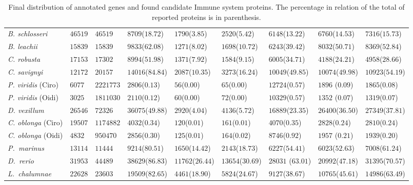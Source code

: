 \documentclass[11pt]{article}
\begin{document}
\begin{table}
\begin{tabular}{p{3.2cm}p{2cm}p{2cm}p{2cm}p{2cm}p{2cm}p{2cm}p{2.7cm}p{2.6cm}}
\textsl{B. schlosseri}& $46519$&$46519$&$8709$($18.72$)&$1790$($3.85$)&$2520$($5.42$)&$6148$($13.2
2$)&$6760$($14.53$)&$7316$($15.73$)\\
\textsl{B. leachii }&   
$15839$&$15839$&$9833$($62.08$)&$1271$($8.02$)&$1698$($10.72$)&$6243$($39.42$)&$
8032$($50.71$)&$8369$($52.84$)\\
\textsl{C. robusta} 
&$17153$&$17302$&$8994$($51.98$)&$1371$($7.92$)&$1584$($9.15$)&$6005$($34.71$)&$
4188$($24.21$)&$4958$($28.66$)\\
\textsl{C. savignyi}&
$12172$&$20157$&$14016$($84.84$)&$2087$($10.35$)&$3273$($16.24$)&$10049$($
49.85$)&$10074$($49.98$)&$10923$($54.19$)\\
\textsl{P. viridis} (Ciro)&     
$6077$&$2221773$&$2806$($0.13$)&$56$($0.00$)&$65$($0.00$)&$12724$($0.57$)&$1896$
($0.09$)&$1865$($0.08$)\\
\textsl{P. viridis} (Oidi)&     
$3025$&$1811030$&$2110$($0.12$)&$60$($0.00$)&$72$($0.00$)&$10329$($0.57$)&$1352$
($0.07$)&$1319$($0.07$)\\
\textsl{D. vexillum}&
$26546$&$72326$&$36075$($49.88$)&$2920$($4.04$)&$4136$($5.72$)&$16889$($23.35$)&
$26400$($36.50$)&$27349$($37.81$)\\
\textsl{C. oblonga} (Ciro)&     
$19507$&$1174882$&$4032$($0.34$)&$120$($0.01$)&$161$($0.01$)&$4070$($0.35$)&$282
8$($0.24$)&$2810$($0.24$)\\
\textsl{C. oblonga} (Oidi)&     
$4832$&$950470$&$2856$($0.30$)&$125$($0.01$)&$164$($0.02$)&$8746$($0.92$)&$1957$
($0.21$)&$1939$($0.20$)\\
\midrule
\textsl{P.\ marinus}
&$13114$&$11444$&$9214$($80.51$)&$1650$($14.42$)&$2143$($18.73$)&$6227$($5
4.41$)&$6023$($52.63$)&$7008$($61.24$)\\
\textsl{D.\ rerio}
&$31953$&$44489$&$38629$($86.83$)&$11762$($26.44$)&$13654$($30.69$)&$28031$
($63.01$)&$20992$($47.18$)&$31395$($70.57$)\\
\textsl{L.\ chalumnae}
&$22628$&$23603$&$19509$($82.65$)&$4461$($18.90$)&$5824$($24.67$)&$9127$($3
8.67$)&$10765$($45.61$)&$14986$($63.49$)\\
\bottomrule
\end{tabular}
\caption{Final distribution of annotated genes and found candidate Immune 
system proteins. The percentage in relation of the total of reported proteins 
is in parenthesis.}
\label{table:distribution_prot}
\end{table}
\end{document}
